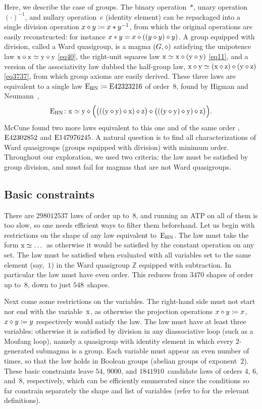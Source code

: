 Here, we describe the case of groups.  The binary operation~$*$, unary operation~$(\cdot )^{-1}$, and nullary operation~$e$ (identity element) can be repackaged into a single division operation $x \diamond y \coloneqq x*y^{-1}$, from which the original operations are easily reconstructed: for instance $x*y=x\diamond((y\diamond y)\diamond y)$.  A group equipped with division, called a Ward quasigroup, is a magma $(G, \diamond)$ satisfying the unipotence law $\mathrm{x} \diamond \mathrm{x} \simeq \mathrm{y} \diamond \mathrm{y}$ \eqref{eq40}, the right-unit squares law $\mathrm{x} \simeq \mathrm{x} \diamond (\mathrm{y} \diamond \mathrm{y})$ \eqref{eq11}, and a version of the associativity law dubbed the half-group law, $\mathrm{x} \diamond \mathrm{y} \simeq (\mathrm{x} \diamond \mathrm{z}) \diamond (\mathrm{y} \diamond \mathrm{z})$ \eqref{eq3737}, from which group axioms are easily derived.
These three laws are equivalent to a single law $\mathrm{E}_{\mathrm{HN}}\coloneqq \mathrm{E}42323216$ of order~$8$, found by Higman and Neumann~\cite{higman-neumann},
\[
\mathrm{E}_{\mathrm{HN}} \colon \mathrm{x} \simeq \mathrm{y} \diamond \Bigl(\bigl(((\mathrm{y} \diamond \mathrm{y}) \diamond \mathrm{x}) \diamond \mathrm{z}\bigr) \diamond \bigl(((\mathrm{y} \diamond \mathrm{y}) \diamond \mathrm{y}) \diamond \mathrm{z}\bigr)\Bigr).
\]
McCune found two more laws equivalent to this one and of the same order \cite{mccune1993single}, $\mathrm{E}42302852$ and $\mathrm{E}147976245$.  A natural question is to find all characterizations of Ward quasigroups (groups equipped with division) with minimum order.
Throughout our exploration, we used two criteria: the law must be satisfied by group division, and must fail for magmas that are not Ward quasigroups.

\subsection{Basic constraints}

There are $\num{298012537}$ laws of order up to~$8$, and running an ATP on all of them is too slow, so one needs efficient ways to filter them beforehand.  Let us begin with restrictions on the shape of any law equivalent to~$\mathrm{E}_{\mathrm{HN}}$.
The law must take the form $\mathrm{x}\simeq\dots$ as otherwise it would be satisfied by the constant operation on any set.
The law must be satisfied when evaluated with all variables set to the same element (say,~$1$) in the Ward quasigroup $\mathbb{Z}$ equipped with subtraction.  In particular the law must have even order.
This reduces from $\num{3470}$ shapes of order up to~$8$, down to just $548$~shapes.

Next come some restrictions on the variables.
The right-hand side must not start nor end with the variable~$\mathrm{x}$, as otherwise the projection operations $x\diamond y \coloneqq x$, $x\diamond y\coloneqq y$ respectively would satisfy the law.
The law must have at least three variables: otherwise it is satisfied by division in any diassociative loop (such as a Moufang loop), namely a quasigroup with identity element in which every $2$-generated submagma is a group.
Each variable must appear an even number of times, so that the law holds in Boolean groups (abelian groups of exponent~$2$).
These basic constraints leave $54$, $\num{9000}$, and $\num{1841910}$~candidate laws of orders $4$, $6$, and~$8$, respectively, which can be efficiently enumerated since the conditions so far constrain separately the shape and list of variables (refer to  for the relevant definitions).

